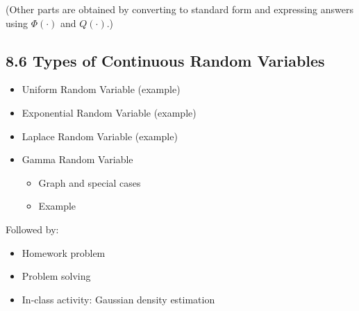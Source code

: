 \documentclass[11pt]{article}
\begin{document}
(Other parts are obtained by converting to standard form and expressing answers using
$\Phi(\cdot)$ and $Q(\cdot)$.)

\subsection*{8.6 Types of Continuous Random Variables}

\begin{itemize}
\item Uniform Random Variable (example)
\item Exponential Random Variable (example)
\item Laplace Random Variable (example)
\item Gamma Random Variable
  \begin{itemize}
  \item Graph and special cases
  \item Example
  \end{itemize}
\end{itemize}

Followed by:
\begin{itemize}
\item Homework problem
\item Problem solving
\item In-class activity: Gaussian density estimation
\end{itemize}
\end{document}

